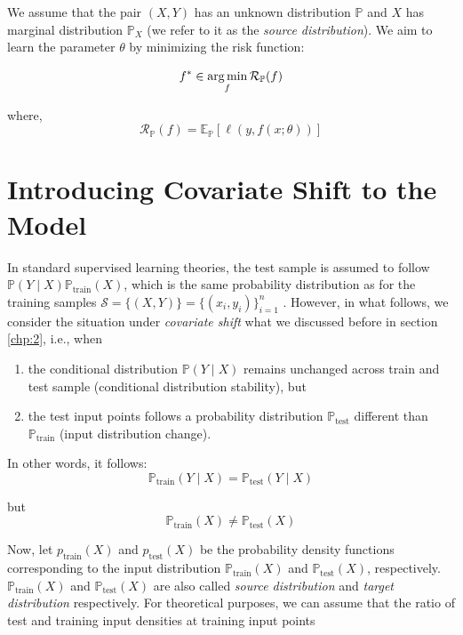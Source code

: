 We assume that the pair $(X,Y)$ has an unknown distribution $\mathbb{P}$ and $X$ has marginal distribution $\mathbb{P}_{X}$ (we refer to it as the \emph{source distribution}). We aim to learn the parameter $\theta$ by minimizing the risk function:

\begin{equation}
    f^* \in \operatorname*{arg\,min}_{f} \mathcal{R}_{\mathbb{P}}(f)
    \label{eqn:4.1}
\end{equation}

where,
\begin{equation}
    \mathcal{R}_{\mathbb{P}}(f) = \mathbb{E}_{\mathbb{P}}[\ell(y, f(x; \theta))]
    \label{eqn:4.2}
\end{equation}

\section{Introducing Covariate Shift to the Model}
In standard supervised learning theories, the test sample is assumed to follow $\mathbb{P}(Y \mid X)\mathbb{P}_{\text{train}}(X)$, which is the same probability distribution as for the training samples $\mathcal{S} = \{(X, Y)\} = \{(x_i, y_i)\}_{i=1}^n$ \citep{sugiyama2000covariate}. However, in what follows, we consider the situation under \emph{covariate shift} what we discussed before in section \ref{chp:2}, i.e., when
\begin{enumerate}
    \item the conditional distribution $\mathbb{P}(Y \mid X)$ remains unchanged across train and test sample (conditional distribution stability), but
    \item the test input points follows a probability distribution $\mathbb{P}_{\text{test}}$ different than $\mathbb{P}_{\text{train}}$ (input distribution change).
\end{enumerate}

In other words, it follows:
\begin{equation}
    \mathbb{P}_{\text{train}}(Y \mid X) = \mathbb{P}_{\text{test}}(Y \mid X)
    \label{eqn:4.3}
\end{equation}

but
\begin{equation}
    \mathbb{P}_{\text{train}} (X) \neq \mathbb{P}_{\text{test}} (X)
    \label{eqn:4.4}
\end{equation}

Now, let $p_{\text{train}}(X)$ and $p_{\text{test}}(X)$ be the probability density functions corresponding to the input distribution $\mathbb{P}_{\text{train}}(X)$ and $\mathbb{P}_{\text{test}}(X)$, respectively. $\mathbb{P}_{\text{train}}(X)$ and $\mathbb{P}_{\text{test}}(X)$ are also called \emph{source distribution} and \emph{target distribution} respectively. For theoretical purposes, we can assume that the ratio of test and training input densities at training input points

